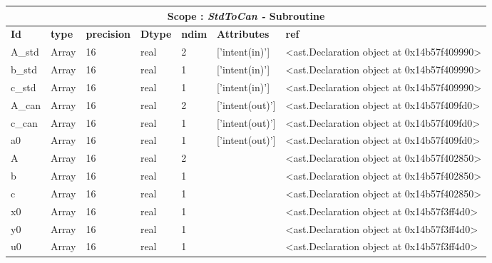 \documentclass{report}
\begin{document}
 \vspace{1cm}

\begin{center}
\begin{longtable}{|p{3.5cm}|p{1.5cm}|p{1.5cm}|p{1.5cm}|p{1cm}|p{2cm}|p{4cm}| }
\hline
\multicolumn{7}{|c|}{\textbf{Scope : \qquad}  \textbf{\textit{StdToCan - }Subroutine}}\\ 
\hline
\textbf{Id} & \textbf{type} & \textbf{precision} & \textbf{Dtype} & \textbf{ndim} & \textbf{Attributes} & \textbf{ref} \\\hline

A\_std & Array & 16 & real & 2 & ['intent(in)'] & <ast.Declaration object at 0x14b57f409990> \\\hline

b\_std & Array & 16 & real & 1 & ['intent(in)'] & <ast.Declaration object at 0x14b57f409990> \\\hline

c\_std & Array & 16 & real & 1 & ['intent(in)'] & <ast.Declaration object at 0x14b57f409990> \\\hline

A\_can & Array & 16 & real & 2 & ['intent(out)'] & <ast.Declaration object at 0x14b57f409fd0> \\\hline

c\_can & Array & 16 & real & 1 & ['intent(out)'] & <ast.Declaration object at 0x14b57f409fd0> \\\hline

a0 & Array & 16 & real & 1 & ['intent(out)'] & <ast.Declaration object at 0x14b57f409fd0> \\\hline

A & Array & 16 & real & 2 &  & <ast.Declaration object at 0x14b57f402850> \\\hline

b & Array & 16 & real & 1 &  & <ast.Declaration object at 0x14b57f402850> \\\hline

c & Array & 16 & real & 1 &  & <ast.Declaration object at 0x14b57f402850> \\\hline

x0 & Array & 16 & real & 1 &  & <ast.Declaration object at 0x14b57f3ff4d0> \\\hline

y0 & Array & 16 & real & 1 &  & <ast.Declaration object at 0x14b57f3ff4d0> \\\hline

u0 & Array & 16 & real & 1 &  & <ast.Declaration object at 0x14b57f3ff4d0> \\\hline


\end{longtable}
\end{center}
\end{document}
